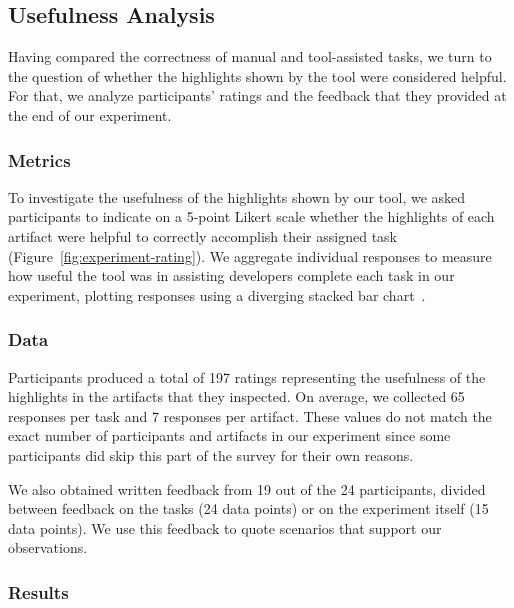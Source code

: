 

\subsection{Usefulness Analysis}
\label{cp6:usefulness}



Having compared the correctness of manual and tool-assisted tasks,
we turn to the question of 
whether the highlights shown by the tool were considered helpful. 
For that, we analyze participants' ratings and the feedback that they 
provided at the end of our experiment.


\subsubsection{Metrics}

To investigate the usefulness of the highlights shown by our tool, we asked participants to indicate on a 5-point Likert scale whether the highlights
of each artifact were helpful to correctly accomplish their assigned task (Figure~\ref{fig:experiment-rating}). We aggregate individual responses to measure how useful the tool was in assisting developers complete each task in our experiment, plotting responses using a diverging stacked bar chart~\cite{spence2001info-viz}.



\subsubsection{Data}


Participants produced a total of 197 ratings representing the usefulness of the highlights in the artifacts that they inspected.
On average, we collected 65 responses per task and 7 responses per artifact.  
These values do not match the exact number of participants and artifacts in our experiment since some participants did skip this part of 
the survey for their own reasons.


We also obtained written feedback from 19 out of the 24 participants, divided between feedback on the tasks (24 data points)
or on the experiment itself (15 data points). We use this feedback to quote scenarios
that support our observations.



\subsubsection{Results}


